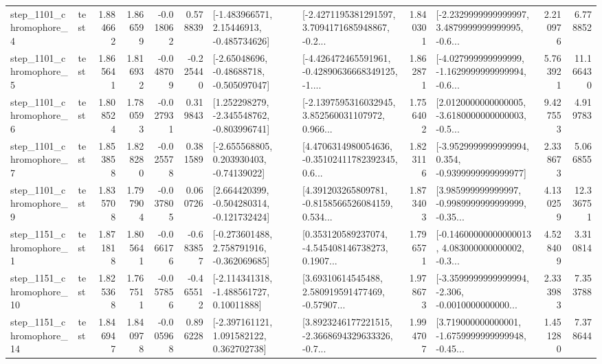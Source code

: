 \begin{tabular}{llrrrrllrlrr}
  step\_1101\_chromophore\_4 &      test &      1.884662 &    1.866599 &     -0.018062 &  0.578839 &    [-1.483966571, 2.15446913, -0.485734626] &  [-2.4271195381291597, 3.7094171685948867, -0.2... &       1.840301 &  [-2.2329999999999997, 3.4879999999999995, -0.6... &            2.210976 &          6.778852 \\
  step\_1101\_chromophore\_5 &      test &      1.865641 &    1.816932 &     -0.048709 & -0.225440 &    [-2.65048696, -0.48688718, -0.505097047] &  [-4.426472465591961, -0.42890636668349125, -1.... &       1.862871 &  [-4.027999999999999, -1.1629999999999994, -0.6... &            5.763921 &         11.166430 \\
  step\_1101\_chromophore\_6 &      test &      1.808524 &    1.780593 &     -0.027931 &  0.319843 &   [1.252298279, -2.345548762, -0.803996741] &  [-2.1397595316032945, 3.852560031107972, 0.966... &       1.756402 &  [2.0120000000000005, -3.6180000000000003, -0.5... &            9.427553 &          4.919783 \\
  step\_1101\_chromophore\_7 &      test &      1.853858 &    1.828280 &     -0.025578 &  0.381589 &    [-2.655568805, 0.203930403, -0.74139022] &  [4.4706314980054636, -0.35102411782392345, 0.6... &       1.823116 &  [-3.9529999999999994, 0.354, -0.9399999999999977] &            2.338673 &          5.066855 \\
  step\_1101\_chromophore\_9 &      test &      1.835708 &    1.797904 &     -0.037805 &  0.060726 &   [2.664420399, -0.504280314, -0.121732424] &  [4.391203265809781, -0.8158566526084159, 0.534... &       1.873403 &  [3.985999999999997, -0.9989999999999999, -0.35... &            4.130259 &         12.336751 \\
  step\_1151\_chromophore\_1 &      test &      1.871818 &    1.805641 &     -0.066176 & -0.683857 &   [-0.273601488, 2.758791916, -0.362069685] &  [0.353120589237074, -4.545408146738273, 0.1907... &       1.796571 &  [-0.14600000000000013, 4.083000000000002, -0.3... &            4.528409 &          3.310814 \\
 step\_1151\_chromophore\_10 &      test &      1.825368 &    1.767511 &     -0.057856 & -0.465512 &    [-2.114341318, -1.488561727, 0.10011888] &  [3.69310614545488, 2.580919591477469, -0.57907... &       1.978673 &  [-3.3599999999999994, -2.306, -0.0010000000000... &            2.333983 &          7.353788 \\
 step\_1151\_chromophore\_14 &      test &      1.846947 &    1.840978 &     -0.005968 &  0.896228 &    [-2.397161121, 1.091582122, 0.362702738] &  [3.8923246177221515, -2.3668694329633326, -0.7... &       1.994707 &  [3.719000000000001, -1.6759999999999948, -0.45... &            1.451280 &          7.378644 \\

\end{tabular}
